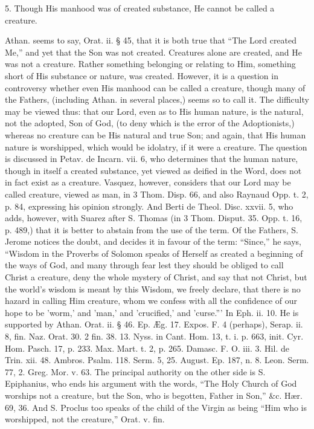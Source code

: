 5. Though His manhood was of created substance,
He cannot be called a creature.

Athan. seems to say, Orat. ii. § 45, that it is
both true that ``The Lord created Me,'' and yet that the Son was not
created. Creatures alone are created, and He was not a creature.
Rather something belonging or relating to Him, something short of His
substance or nature, was created. However, it is a question in
controversy whether even His manhood can be called a creature, though
many of the Fathers, (including Athan. in several places,) seems so to
call it. The difficulty may be viewed thus: that our Lord, even as to
His human nature, is the natural, not the adopted, Son of God, (to
deny which is the error of the Adoptionists,) whereas no creature can
be His natural and true Son; and again, that His human nature is
worshipped, which would be idolatry, if it were a creature. The
question is discussed in Petav. de Incarn. vii. 6, who
determines that the human nature, though in itself a created
substance, yet viewed as deified in the Word, does not in fact exist
as a creature. Vasquez, however, considers that our Lord may be called
creature, viewed as man, in 3 Thom. Disp. 66, and also Raynaud Opp. t.
2, p. 84, expressing his opinion strongly. And Berti de Theol. Disc.
xxvii. 5, who adds, however, with Suarez after S. Thomas (in 3 Thom.
Disput. 35. Opp. t. 16, p. 489,) that it is better to abstain from the
use of the term. Of the Fathers, S. Jerome notices the doubt, and
decides it in favour of the term: ``Since,'' he says, ``Wisdom in the
Proverbs of Solomon speaks of Herself as created a beginning of the
ways of God, and many through fear lest they should be obliged to call
Christ a creature, deny the whole mystery of Christ, and say that not
Christ, but the world's wisdom is meant by this Wisdom, we freely
declare, that there is no hazard in calling Him creature, whom we
confess with all the confidence of our hope to be 'worm,' and 'man,'
and 'crucified,' and 'curse.''' In Eph. ii. 10. He is supported by
Athan. Orat. ii. § 46. Ep. Æg. 17. Expos. F. 4 (perhaps), Serap. ii.
8, fin. Naz. Orat. 30. 2 fin. 38. 13. Nyss. in Cant. Hom. 13, t. i. p.
663, init. Cyr. Hom. Pasch. 17, p. 233. Max. Mart. t. 2, p. 265.
Damasc. F. O. iii. 3. Hil. de Trin. xii. 48. Ambros. Psalm. 118. Serm.
5, 25. August. Ep. 187, n. 8. Leon. Serm. 77, 2. Greg. Mor. v. 63. The
principal authority on the other side is S. Epiphanius, who ends his
argument with the words, ``The Holy Church of God worships not a
creature, but the Son, who is begotten, Father in Son,'' \&c.
Hær. 69, 36. And S. Proclus too speaks of the child of the Virgin as
being ``Him who is worshipped, not the creature,'' Orat. v. fin.

